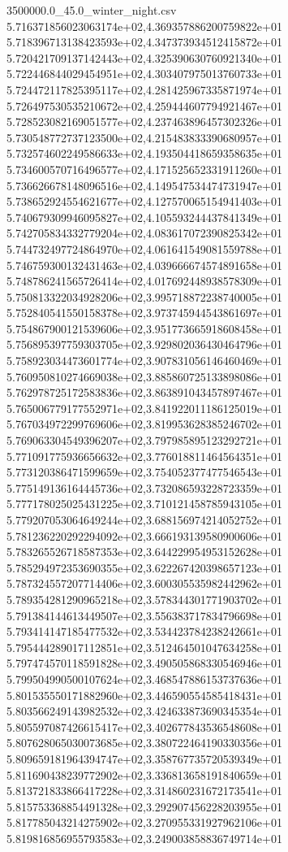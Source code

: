 \begin{filecontents*}{3500000.0_45.0_winter_night.csv}
5.716371856023063174e+02,4.369357886200759822e+01
5.718396713138423593e+02,4.347373934512415872e+01
5.720421709137142443e+02,4.325390630760921340e+01
5.722446844029454951e+02,4.303407975013760733e+01
5.724472117825395117e+02,4.281425967335871974e+01
5.726497530535210672e+02,4.259444607794921467e+01
5.728523082169051577e+02,4.237463896457302326e+01
5.730548772737123500e+02,4.215483833390680957e+01
5.732574602249586633e+02,4.193504418659358635e+01
5.734600570716496577e+02,4.171525652331911260e+01
5.736626678148096516e+02,4.149547534474731947e+01
5.738652924554621677e+02,4.127570065154941403e+01
5.740679309946095827e+02,4.105593244437841349e+01
5.742705834332779204e+02,4.083617072390825342e+01
5.744732497724864970e+02,4.061641549081559788e+01
5.746759300132431463e+02,4.039666674574891658e+01
5.748786241565726414e+02,4.017692448938578309e+01
5.750813322034928206e+02,3.995718872238740005e+01
5.752840541550158378e+02,3.973745944543861697e+01
5.754867900121539606e+02,3.951773665918608458e+01
5.756895397759303705e+02,3.929802036430464796e+01
5.758923034473601774e+02,3.907831056146460469e+01
5.760950810274669038e+02,3.885860725133898086e+01
5.762978725172583836e+02,3.863891043457897467e+01
5.765006779177552971e+02,3.841922011186125019e+01
5.767034972299769606e+02,3.819953628385246702e+01
5.769063304549396207e+02,3.797985895123292721e+01
5.771091775936656632e+02,3.776018811464564351e+01
5.773120386471599659e+02,3.754052377477546543e+01
5.775149136164445736e+02,3.732086593228723359e+01
5.777178025025431225e+02,3.710121458785943105e+01
5.779207053064649244e+02,3.688156974214052752e+01
5.781236220292294092e+02,3.666193139580900606e+01
5.783265526718587353e+02,3.644229954953152628e+01
5.785294972353690355e+02,3.622267420398657123e+01
5.787324557207714406e+02,3.600305535982442962e+01
5.789354281290965218e+02,3.578344301771903702e+01
5.791384144613449507e+02,3.556383717834796698e+01
5.793414147185477532e+02,3.534423784238242661e+01
5.795444289017112851e+02,3.512464501047634258e+01
5.797474570118591828e+02,3.490505868330546946e+01
5.799504990500107624e+02,3.468547886153737636e+01
5.801535550171882960e+02,3.446590554585418431e+01
5.803566249143982532e+02,3.424633873690345354e+01
5.805597087426615417e+02,3.402677843536548608e+01
5.807628065030073685e+02,3.380722464190330356e+01
5.809659181964394747e+02,3.358767735720539349e+01
5.811690438239772902e+02,3.336813658191840659e+01
5.813721833866417228e+02,3.314860231672173541e+01
5.815753368854491328e+02,3.292907456228203955e+01
5.817785043214275902e+02,3.270955331927962106e+01
5.819816856955793583e+02,3.249003858836749714e+01

\end{filecontents*}

